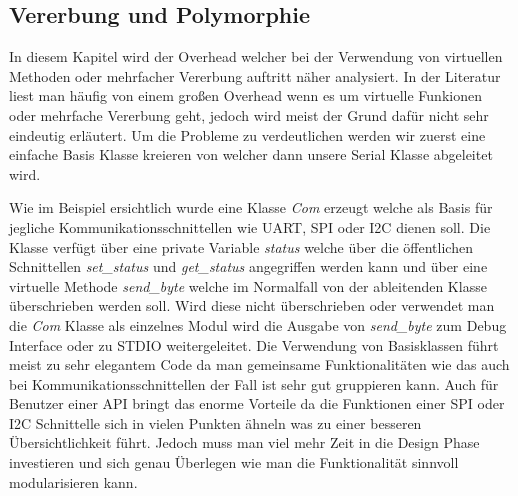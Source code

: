 \documentclass[MES,Master,ngerman]{twbook}%
\begin{document}
\subsection{Vererbung und Polymorphie}
In diesem Kapitel wird der Overhead welcher bei der Verwendung von virtuellen Methoden oder mehrfacher Vererbung auftritt näher analysiert. In der Literatur liest man häufig von einem großen Overhead wenn es um virtuelle Funkionen oder mehrfache Vererbung geht, jedoch wird meist der Grund dafür nicht sehr eindeutig erläutert. Um die Probleme zu verdeutlichen werden wir zuerst eine einfache Basis Klasse kreieren von welcher dann unsere Serial Klasse abgeleitet wird.

\begin{figure}[!htb]
	\begin{subfigure}[b]{0.5\textwidth}
		
		\label{fig:30}
	\end{subfigure}
	\begin{subfigure}[b]{0.5\textwidth}
		
		\label{fig:31}
	\end{subfigure}
\end{figure}

Wie im Beispiel ersichtlich wurde eine Klasse \textit{Com} erzeugt welche als Basis für jegliche Kommunikationsschnittellen wie UART, SPI oder I2C dienen soll. Die Klasse verfügt über eine private Variable \textit{status} welche über die öffentlichen Schnittellen \textit{set\_status} und \textit{get\_status} angegriffen werden kann und über eine virtuelle Methode \textit{send\_byte} welche im Normalfall von der ableitenden Klasse überschrieben werden soll. Wird diese nicht überschrieben oder verwendet man die \textit{Com} Klasse als einzelnes Modul wird die Ausgabe von \textit{send\_byte} zum Debug Interface oder zu STDIO weitergeleitet. \newline \newline Die Verwendung von Basisklassen führt meist zu sehr elegantem Code da man gemeinsame Funktionalitäten wie das auch bei Kommunikationsschnittellen der Fall ist sehr gut gruppieren kann. Auch für Benutzer einer API bringt das enorme Vorteile da die Funktionen einer SPI oder I2C Schnittelle sich in vielen Punkten ähneln was zu einer besseren Übersichtlichkeit führt. Jedoch muss man viel mehr Zeit in die Design Phase investieren und sich genau Überlegen wie man die Funktionalität sinnvoll modularisieren kann. 
\end{document}
